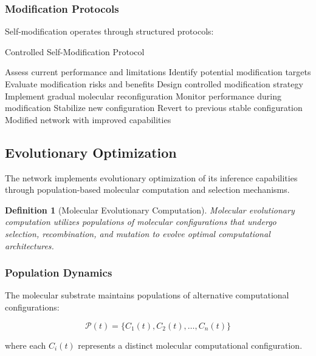 \documentclass[12pt,a4paper]{article}
\newtheorem{definition}[theorem]{Definition}
\begin{document}
\subsubsection{Modification Protocols}

Self-modification operates through structured protocols:

\begin{algorithm}
\caption{Controlled Self-Modification Protocol}
\begin{algorithmic}[1]
\STATE Assess current performance and limitations
\STATE Identify potential modification targets
\STATE Evaluate modification risks and benefits
\STATE Design controlled modification strategy
\STATE Implement gradual molecular reconfiguration
\STATE Monitor performance during modification
    \STATE Stabilize new configuration
\ELSE
    \STATE Revert to previous stable configuration
\ENDIF
\RETURN Modified network with improved capabilities
\end{algorithmic}
\end{algorithm}

\subsection{Evolutionary Optimization}

The network implements evolutionary optimization of its inference capabilities through population-based molecular computation and selection mechanisms.

\begin{definition}[Molecular Evolutionary Computation]
Molecular evolutionary computation utilizes populations of molecular configurations that undergo selection, recombination, and mutation to evolve optimal computational architectures.
\end{definition}

\subsubsection{Population Dynamics}

The molecular substrate maintains populations of alternative computational configurations:

\begin{equation}
\mathcal{P}(t) = \{C_1(t), C_2(t), \ldots, C_n(t)\}
\end{equation}

where each $C_i(t)$ represents a distinct molecular computational configuration.
\end{document}
